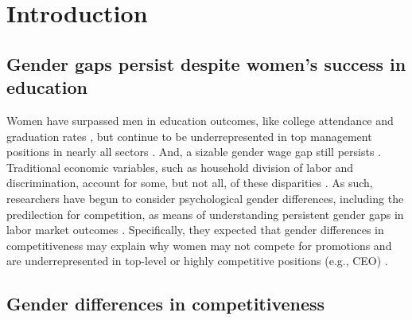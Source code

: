 \documentclass[letterpaper, nobind]{templates/ociamthesis}
\begin{document}
\hypertarget{introduction}{%
\section{Introduction}\label{introduction}}

\hypertarget{gender-gaps-persist-despite-womens-success-in-education}{%
\subsection{Gender gaps persist despite women's success in education}\label{gender-gaps-persist-despite-womens-success-in-education}}

Women have surpassed men in education outcomes, like college attendance and graduation rates \autocite{Blau2017,Goldin2006,Stoet2015}, but continue to be underrepresented in top management positions in nearly all sectors \autocite{Bertrand2001}. And, a sizable gender wage gap still persists \autocite{Blau2017}. Traditional economic variables, such as household division of labor and discrimination, account for some, but not all, of these disparities \autocite{Blau2017}. As such, researchers have begun to consider psychological gender differences, including the predilection for competition, as means of understanding persistent gender gaps in labor market outcomes \autocite[for review, see][]{Niederle2011}. Specifically, they expected that gender differences in competitiveness may explain why women may not compete for promotions and are underrepresented in top-level or highly competitive positions (e.g., CEO) \autocite{Niederle2007}.

\hypertarget{gender-differences-in-competitiveness}{%
\subsection{Gender differences in competitiveness}\label{gender-differences-in-competitiveness}}
\end{document}
